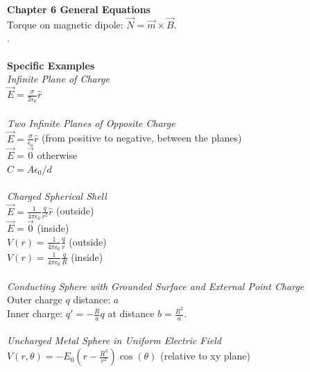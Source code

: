 \documentclass[12pt]{article}
\newcommand{\ds}{\displaystyle}
\begin{document}
\begin{flushleft}
\textbf{Chapter 6 General Equations}\\
Torque on magnetic dipole: $\ds \vec{N}=\vec{m}\times\vec{B}$.\\


.\\~\\


\textbf{Specific Examples}\\
\textit{Infinite Plane of Charge}\\
$\ds \vec{E}=\frac{\sigma}{2\epsilon_0}\hat{r}$\\~\\

\textit{Two Infinite Planes of Opposite Charge}\\
$\ds \vec{E}=\frac{\sigma}{\epsilon_0}\hat{r}$ (from positive to negative, between the planes)\\
$\ds \vec{E}=\vec{0}$ otherwise\\
$\ds C=A\epsilon_0/d$\\~\\

\textit{Charged Spherical Shell}\\
$\ds \vec{E}=\frac{1}{4\pi\epsilon_0}\frac{q}{r^2}\hat{r}$ (outside)\\
$\ds \vec{E}=\vec{0}$ (inside)\\
$\ds V(r)=\frac{1}{4\pi\epsilon_0}\frac{q}{r}$ (outside)\\
$\ds V(r)=\frac{1}{4\pi\epsilon_0}\frac{q}{R}$ (inside)\\~\\

\textit{Conducting Sphere with Grounded Surface and External Point Charge}\\
Outer charge $q$ distance: $a$\\
Inner charge: $q'=-\frac{R}{a}q$ at distance $b=\frac{R^2}{a}$.\\~\\

\textit{Uncharged Metal Sphere in Uniform Electric Field}\\
$\ds V(r,\theta)=-E_0\left(r-\frac{R^3}{r^2}\right)\cos(\theta)$ (relative to xy plane)\\~\\


\end{flushleft}
\end{document}

